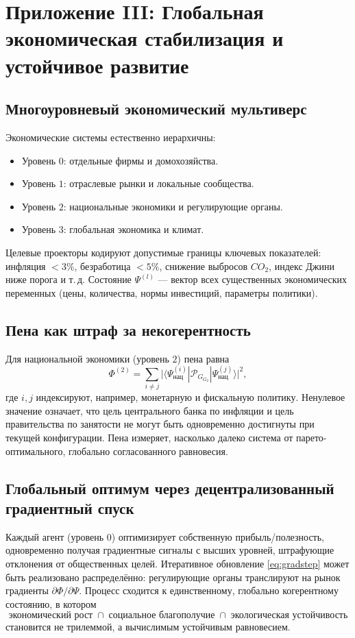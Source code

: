 \documentclass[11pt,a4paper]{article}
\theoremstyle{definition}
\newcommand{\pG}{\mathcal{P}_{\!G}}
\newcommand{\Foam}{\Phi}
\begin{document}
\section{Приложение III: Глобальная экономическая стабилизация и устойчивое развитие}

\subsection{Многоуровневый экономический мультиверс}

Экономические системы естественно иерархичны:
\begin{itemize}
    \item Уровень $0$: отдельные фирмы и домохозяйства.
    \item Уровень $1$: отраслевые рынки и локальные сообщества.
    \item Уровень $2$: национальные экономики и регулирующие органы.
    \item Уровень $3$: глобальная экономика и климат.
\end{itemize}

Целевые проекторы кодируют допустимые границы ключевых показателей: инфляция $<3\%$, безработица $<5\%$, снижение выбросов $CO_2$, индекс Джини ниже порога и т. д. Состояние $\Psi^{(l)}$ — вектор всех существенных экономических переменных (цены, количества, нормы инвестиций, параметры политики).

\subsection{Пена как штраф за некогерентность}

Для национальной экономики (уровень $2$) пена равна
\[
\Foam^{(2)} = \sum_{i\neq j} \bigl| \langle \Psi^{(i)}_{\text{нац}} | \pG_{G_2} | \Psi^{(j)}_{\text{нац}} \rangle \bigr|^2,
\]
где $i,j$ индексируют, например, монетарную и фискальную политику. Ненулевое значение означает, что цель центрального банка по инфляции и цель правительства по занятости не могут быть одновременно достигнуты при текущей конфигурации. Пена измеряет, насколько далеко система от парето-оптимального, глобально согласованного равновесия.

\subsection{Глобальный оптимум через децентрализованный градиентный спуск}

Каждый агент (уровень $0$) оптимизирует собственную прибыль/полезность, одновременно получая градиентные сигналы с высших уровней, штрафующие отклонения от общественных целей. Итеративное обновление \eqref{eq:gradstep} может быть реализовано распределённо: регулирующие органы транслируют на рынок градиенты $\partial\Foam/\partial\Psi$. Процесс сходится к единственному, глобально когерентному состоянию, в котором
\[
\text{экономический рост} \;\cap\; \text{социальное благополучие} \;\cap\; \text{экологическая устойчивость}
\]
становится не трилеммой, а вычислимым устойчивым равновесием.
\end{document}
